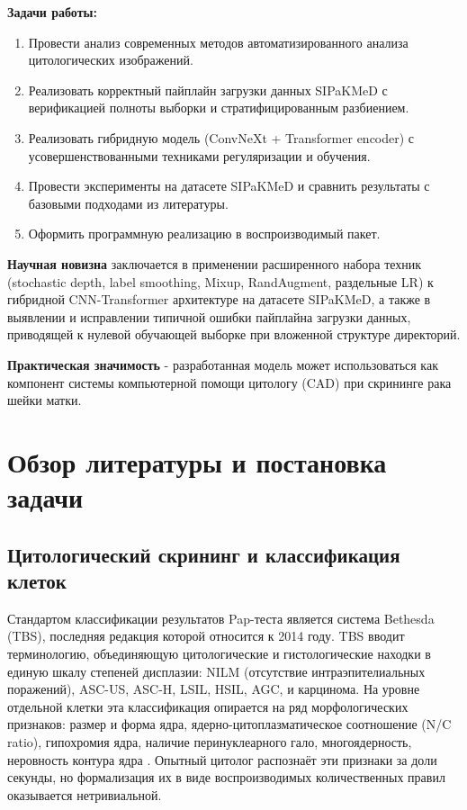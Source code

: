 \documentclass[14pt,a4paper]{extreport}
\begin{document}
\textbf{Задачи работы:}
\begin{enumerate}
    \item Провести анализ современных методов автоматизированного анализа
          цитологических изображений.
    \item Реализовать корректный пайплайн загрузки данных SIPaKMeD с
          верификацией полноты выборки и стратифицированным разбиением.
    \item Реализовать гибридную модель (ConvNeXt + Transformer encoder)
          с усовершенствованными техниками регуляризации и обучения.
    \item Провести эксперименты на датасете SIPaKMeD и сравнить результаты
          с базовыми подходами из литературы.
    \item Оформить программную реализацию в воспроизводимый пакет.
\end{enumerate}

\textbf{Научная новизна} заключается в применении расширенного набора техник
(stochastic depth, label smoothing, Mixup, RandAugment, раздельные LR) к
гибридной CNN-Transformer архитектуре на датасете SIPaKMeD, а также в
выявлении и исправлении типичной ошибки пайплайна загрузки данных, приводящей
к нулевой обучающей выборке при вложенной структуре директорий.

\textbf{Практическая значимость} - разработанная модель может использоваться
как компонент системы компьютерной помощи цитологу (CAD) при скрининге рака
шейки матки.

\chapter{Обзор литературы и постановка задачи}
\label{ch:literature}

\section{Цитологический скрининг и классификация клеток}

Стандартом классификации результатов Pap-теста является система Bethesda
(TBS), последняя редакция которой относится к 2014 году. TBS вводит
терминологию, объединяющую цитологические и гистологические находки в единую
шкалу степеней дисплазии: NILM (отсутствие интраэпителиальных поражений),
ASC-US, ASC-H, LSIL, HSIL, AGC, и карцинома. На уровне отдельной клетки эта
классификация опирается на ряд морфологических признаков: размер и форма ядра,
ядерно-цитоплазматическое соотношение (N/C ratio), гипохромия ядра, наличие
перинуклеарного гало, многоядерность, неровность контура ядра
\cite{randel2013acog}. Опытный цитолог распознаёт эти признаки за доли
секунды, но формализация их в виде воспроизводимых количественных правил
оказывается нетривиальной.
\end{document}
